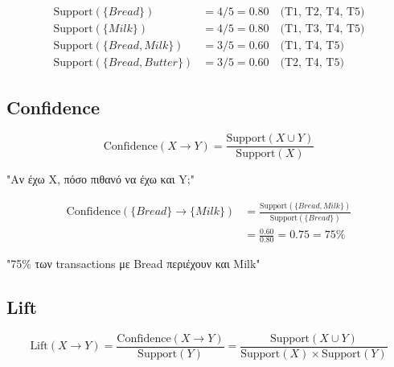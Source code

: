\begin{examplebox}
\begin{align*}
\text{Support}(\{Bread\}) &= 4/5 = 0.80 \quad \text{(T1, T2, T4, T5)} \\
\text{Support}(\{Milk\}) &= 4/5 = 0.80 \quad \text{(T1, T3, T4, T5)} \\
\text{Support}(\{Bread, Milk\}) &= 3/5 = 0.60 \quad \text{(T1, T4, T5)} \\
\text{Support}(\{Bread, Butter\}) &= 3/5 = 0.60 \quad \text{(T2, T4, T5)}
\end{align*}
\end{examplebox}

\subsection{Confidence}

\begin{formulabox}[Confidence]
\begin{equation}
\text{Confidence}(X \to Y) = \frac{\text{Support}(X \cup Y)}{\text{Support}(X)}
\end{equation}

"Αν έχω X, πόσο πιθανό να έχω και Y;"
\end{formulabox}

\begin{examplebox}
\begin{align*}
\text{Confidence}(\{Bread\} \to \{Milk\}) &= \frac{\text{Support}(\{Bread, Milk\})}{\text{Support}(\{Bread\})} \\
&= \frac{0.60}{0.80} = 0.75 = 75\%
\end{align*}

"75\% των transactions με Bread περιέχουν και Milk"
\end{examplebox}

\subsection{Lift}

\begin{formulabox}[Lift]
\begin{equation}
\text{Lift}(X \to Y) = \frac{\text{Confidence}(X \to Y)}{\text{Support}(Y)} = \frac{\text{Support}(X \cup Y)}{\text{Support}(X) \times \text{Support}(Y)}
\end{equation}
\end{formulabox}

